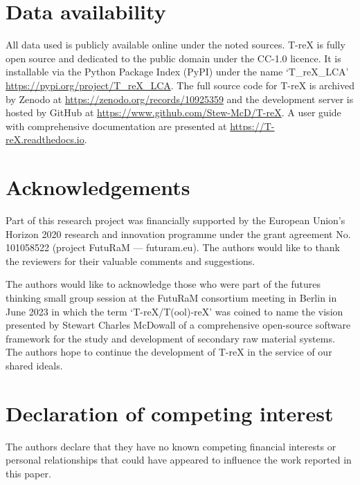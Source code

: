 \documentclass[a4paper,fleqn]{cas-dc}
\begin{document}
\section*{Data availability}
All data used is publicly available online under the noted sources. T-reX is fully open source and dedicated to the public domain under the CC-1.0 licence. It is installable via the Python Package Index (PyPI) under the name `T\_reX\_LCA' \url{https://pypi.org/project/T_reX_LCA}.
The full source code for T-reX is archived by Zenodo at \url{https://zenodo.org/records/10925359} 
and the development server is hosted by GitHub at \url{https://www.github.com/Stew-McD/T-reX}. A user guide with comprehensive documentation are presented at \url{https://T-reX.readthedocs.io}.

\section*{Acknowledgements}
Part of this research project was financially supported by the European Union's Horizon 2020 research and innovation programme under the grant agreement No. 101058522 (project FutuRaM --- futuram.eu). The authors would like to thank the reviewers for their valuable comments and suggestions.

The authors would like to acknowledge those who were part of the futures
thinking small group session at the FutuRaM consortium meeting in Berlin in
June 2023 in which the term `T-reX/T(ool)-reX' was coined to name the vision
presented by Stewart Charles McDowall of a comprehensive open-source software
framework for the study and development of secondary raw material systems. The
authors hope to continue the development of T-reX in the service of our shared
ideals.

\section*{Declaration of competing interest}
The authors declare that they have no known competing financial interests or personal relationships that could have appeared to influence the work reported in this paper.

\printcredits
\end{document}
